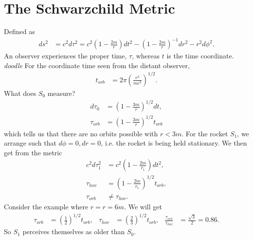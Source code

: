 \documentclass[a4paper, 11pt, normalem]{report}
\begin{document}
\section{The Schwarzchild Metric}
Defined as
\begin{align}
    ds^2 &= c^2d\tau^2 = c^2\left(1-\frac{2m}{r}\right)dt^2 - \left(1-\frac{2m}{r}\right)^{-1}dr^2 - r^2d\phi^2.
\end{align}
An observer experiences the proper time, $\tau$, whereas $t$ is the time coordinate.
\textit{doodle}
For the coordinate time seen from the distant observer,
\begin{align}
    t_{orb} &= 2\pi\left(\frac{r^3}{mc^2}\right)^{1/2}.
\end{align}
What does $S_0$ measure?
\begin{align}
    d\tau_0 &= \left(1-\frac{3m}{r}\right)^{1/2}dt,\\
    \tau_{orb} &= \left(1-\frac{3m}{r}\right)^{1/2}t_{orb}
\end{align}
which tells us that there are no orbits possible with $r<3m$.
For the rocket $S_1$, we arrange such that $d\phi=0,dr=0$, i.e. the rocket is being held stationary.
We then get from the metric
\begin{align}
    c^2d\tau_1^2 &= c^2\left(1-\frac{2m}{r_1}\right)dt^2, \\
    \tau_{hov} &= \left(1-\frac{2m}{r_1}\right)^{1/2}t_{orb},\\
    \tau_{orb} &\neq \tau_{hov}.
\end{align}
Consider the example where $r=r=6m$.
We will get
\begin{align}
    \tau_{orb} &= \left(\frac12\right)^{1/2}t_{orb}, & \tau_{hov} &= \left(\frac23\right)^{1/2}t_{orb}, & \frac{\tau_{orb}}{\tau_{hov}} &= \frac{\sqrt{3}}{2} = 0.86.
\end{align}
So $S_1$ perceives themselves as older than $S_0$.
\end{document}
